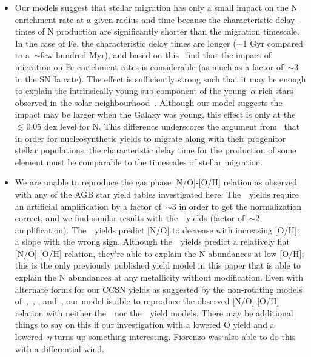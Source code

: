 \documentclass[ms.tex]{subfiles}
\begin{document}
\begin{itemize}
	\item Our models suggest that stellar migration has only a small impact on 
	the N enrichment rate at a given radius and time because the characteristic 
	delay-times of N production are significantly shorter than the migration 
	timescale. 
	In the case of Fe, the characteristic delay times are longer ($\sim$1 Gyr 
	compared to a~$\sim$few hundred Myr), and based on this~\citet{Johnson2021} 
	find that the impact of migration on Fe enrichment rates is considerable 
	(as much as a factor of~$\sim$3 in the SN Ia rate). 
	The effect is sufficiently strong such that it may be enough to explain the 
	intrinsically young sub-component of the young~$\alpha$-rich stars observed 
	in the solar neighbourhood~\citep{Chiappini2015, Martig2015, Martig2016, 
	Jofre2016, Yong2016, Izzard2018, SilvaAguirre2018, Warfield2021}. 
	Although our model suggests the impact may be larger when the Galaxy was 
	young, this effect is only at the~$\lesssim0.05$ dex level for N. 
	This difference underscores the argument from~\citet{Johnson2021} that in 
	order for nucleosynthetic yields to migrate along with their progenitor 
	stellar populations, the characteristic delay time for the production of 
	some element must be comparable to the timescales of stellar migration. 

	\item We are unable to reproduce the gas phase [N/O]-[O/H] relation 
	as observed with any of the AGB star yield tables investigated here. 
	The~\cristallo~yields require an artificial amplification by a factor 
	of~$\sim$3 in order to get the normalization correct, and we find similar 
	results with the~\ventura~yields (factor of~$\sim$2 amplification). 
	The~\karakasten~yields predict [N/O] to decrease with increasing [O/H]: a 
	slope with the wrong sign. 
	Although the~\karakas~yields predict a relatively flat [N/O]-[O/H] 
	relation, they're able to explain the N abundances at low [O/H]; this is 
	the only previously published yield model in this paper that is able to 
	explain the N abundances at any metallicity without modification. 
	Even with alternate forms for our CCSN yields as suggested by the 
	non-rotating models of~\citet{Woosley1995},~\citet{Nomoto2013}, 
	\citet{Sukhbold2016}, and~\citet{Limongi2018}, our model is able to 
	reproduce the observed [N/O]-[O/H] relation with neither 
	the~\karakasten~nor the~\karakas~yield models. 
	{\color{red} 
	There may be additional things to say on this if our investigation with 
	a lowered O yield and a lowered~$\eta$ turns up something interesting. 
	Fiorenzo was also able to do this with a differential wind. 
	}


\end{itemize}
\end{document}
